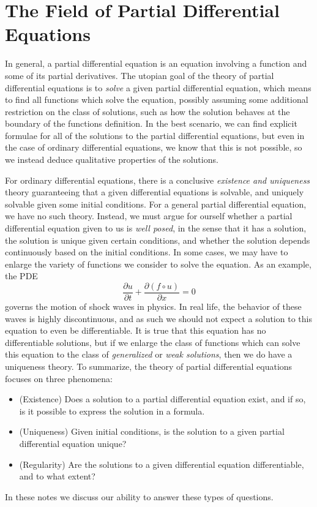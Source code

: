 \section{The Field of Partial Differential Equations}

In general, a partial differential equation is an equation involving a function and some of its partial derivatives. The utopian goal of the theory of partial differential equations is to {\it solve} a given partial differential equation, which means to find all functions which solve the equation, possibly assuming some additional restriction on the class of solutions, such as how the solution behaves at the boundary of the functions definition. In the best scenario, we can find explicit formulae for all of the solutions to the partial differential equations, but even in the case of ordinary differential equations, we know that this is not possible, so we instead deduce qualitative properties of the solutions.

For ordinary differential equations, there is a conclusive {\it existence and uniqueness} theory guaranteeing that a given differential equations is solvable, and uniquely solvable given some initial conditions. For a general partial differential equation, we have no such theory. Instead, we must argue for ourself whether a partial differential equation given to us is {\it well posed}, in the sense that it has a solution, the solution is unique given certain conditions, and whether the solution depends continuously based on the initial conditions. In some cases, we may have to enlarge the variety of functions we consider to solve the equation. As an example, the PDE
%
\[ \frac{\partial u}{\partial t} + \frac{\partial (f \circ u)}{\partial x} = 0 \]
%
governs the motion of shock waves in physics. In real life, the behavior of these waves is highly discontinuous, and as such we should not expect a solution to this equation to even be differentiable. It is true that this equation has no differentiable solutions, but if we enlarge the class of functions which can solve this equation to the class of {\it generalized} or {\it weak solutions}, then we do have a uniqueness theory. To summarize, the theory of partial differential equations focuses on three phenomena:
%
\begin{itemize}
    \item (Existence) Does a solution to a partial differential equation exist, and if so, is it possible to express the solution in a formula.

    \item (Uniqueness) Given initial conditions, is the solution to a given partial differential equation unique?

    \item (Regularity) Are the solutions to a given differential equation differentiable, and to what extent?
\end{itemize}
%
In these notes we discuss our ability to answer these types of questions.

